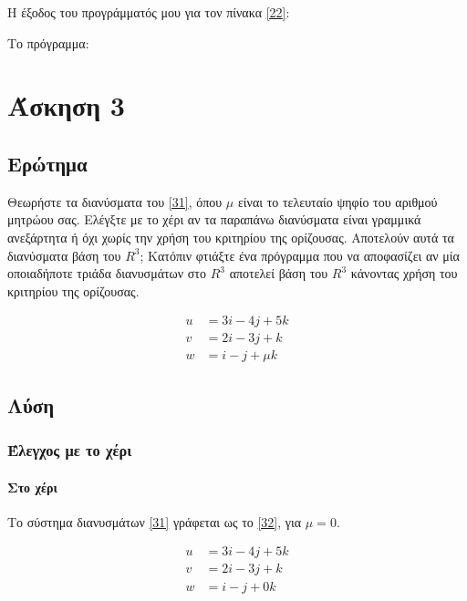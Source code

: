 \documentclass[12pt, fleqn, leqno]{extreport}
\begin{document}
Η έξοδος του προγράμματός μου για τον πίνακα \eqref{22}:


Το πρόγραμμα:



\chapter{Άσκηση 3}
\section{Ερώτημα}

Θεωρήστε τα διανύσματα του \eqref{31}, όπου $\mu$ είναι το τελευταίο ψηφίο του αριθμού μητρώου σας. Ελέγξτε με το χέρι αν τα παραπάνω διανύσματα είναι γραμμικά ανεξάρτητα ή όχι χωρίς την χρήση του κριτηρίου της ορίζουσας. Αποτελούν αυτά τα διανύσματα βάση του $R^{3}$; Κατόπιν φτιάξτε ένα πρόγραμμα που να αποφασίζει αν μία οποιαδήποτε τριάδα διανυσμάτων στο $R^{3}$ αποτελεί βάση του $R^{3}$ κάνοντας χρήση του κριτηρίου της ορίζουσας.

\begin{equation}%
    \begin{aligned}
        u & = 3i - 4j + 5k  \\
        v & = 2i - 3j + k   \\
        w & = i - j + \mu k
    \end{aligned}\label{31}
\end{equation}

\newpage
\section{Λύση}
\subsection{Έλεγχος με το χέρι}
\subsubsection{Στο χέρι}

Το σύστημα διανυσμάτων \eqref{31} γράφεται ως το \eqref{32}, για $\mu = 0$.

\begin{equation}%
    \begin{aligned}
        u & = 3i - 4j + 5k \\
        v & = 2i - 3j + k  \\
        w & = i - j + 0k
    \end{aligned}\label{32}
\end{equation}
\end{document}
